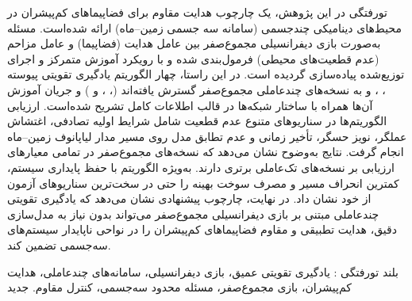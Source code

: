 

\pagestyle{plain}

\begin{وسط‌چین}
\end{وسط‌چین}

‌تورفتگی 
در این پژوهش، یک چارچوب هدایت مقاوم برای فضاپیماهای کم‌پیشران در محیط‌های دینامیکی چندجسمی (سامانه سه جسمی زمین–ماه) ارائه شده‌است. مسئله به‌صورت بازی دیفرانسیلی مجموع‌صفر بین عامل هدایت (فضاپیما) و عامل مزاحم (عدم قطعیت‌های محیطی) فرمول‌بندی شده و با رویکرد آموزش متمرکز و اجرای توزیع‌شده پیاده‌سازی گردیده است. در این راستا، چهار الگوریتم یادگیری تقویتی پیوسته ، ،  و  به نسخه‌های چندعاملی مجموع‌صفر گسترش یافته‌اند (، ،  و ) و 
جریان آموزش آن‌ها همراه با ساختار شبکه‌ها در قالب اطلاعات کامل تشریح شده‌است.
ارزیابی الگوریتم‌ها در سناریوهای متنوع عدم قطعیت شامل شرایط اولیه تصادفی، اغتشاش عملگر، نویز حسگر، تأخیر زمانی و عدم تطابق مدل روی مسیر مدار لیاپانوف زمین–ماه انجام گرفت. نتایج به‌وضوح نشان می‌دهد که نسخه‌های مجموع‌صفر در تمامی معیارهای ارزیابی بر نسخه‌های تک‌عاملی برتری دارند. به‌ویژه الگوریتم  با حفظ پایداری سیستم، کمترین انحراف مسیر و مصرف سوخت بهینه را حتی در سخت‌ترین سناریوهای آزمون از خود نشان داد.
در نهایت، چارچوب پیشنهادی نشان می‌دهد که یادگیری تقویتی چندعاملی مبتنی بر بازی دیفرانسیلی مجموع‌صفر می‌تواند بدون نیاز به مدل‌سازی دقیق، هدایت تطبیقی و مقاوم فضاپیماهای کم‌پیشران را در نواحی ناپایدار سیستم‌های سه‌جسمی تضمین کند.


‌بلند
‌تورفتگی : 
 یادگیری تقویتی عمیق، بازی دیفرانسیلی، سامانه‌های چندعاملی، هدایت کم‌پیشران، بازی مجموع‌صفر، مسئله محدود سه‌جسمی، کنترل مقاوم.
‌جدید
